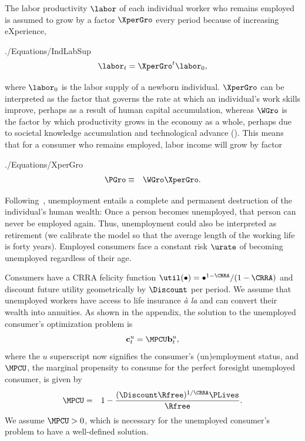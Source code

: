 \documentclass[titlepage]{\econtex}\newcommand{\texname}{cjSOE}
\begin{document}
The labor
productivity $\labor$ of each individual worker who remains employed
is assumed to grow by a factor $\XperGro$ every period because of increasing
eXperience,
\begin{verbatimwrite}{./Equations/IndLabSup}
\begin{equation}
\labor_{t} =    \XperGro^t \labor_{0}
\label{eq:IndLabSup},
\end{equation}
\end{verbatimwrite}

where $\labor_0$ is the labor supply of a newborn
individual. $\XperGro$ can be interpreted as the factor that governs
the rate at which an individual's work skills improve, perhaps as a
result of human capital accumulation, whereas $\WGro$ is the factor by
which productivity grows in the economy as a whole, perhaps due to
societal knowledge accumulation and technological advance
(\cite{mankiw:growth}). This means that for a consumer who remains
employed, labor income will grow by factor
\begin{verbatimwrite}{./Equations/XperGro}
\begin{eqnarray*}
\PGro & \equiv & \WGro \XperGro.
\end{eqnarray*}
\end{verbatimwrite}


Following~\cite{toche:urisk}, unemployment entails a complete and permanent destruction of the individual's human wealth: Once a person becomes unemployed, that person can never be employed
again. Thus, unemployment could also be interpreted as retirement (we calibrate the model so that the average length of the working life is forty years). Employed consumers face a constant risk $\urate$ of becoming unemployed regardless of their age.

Consumers have a CRRA felicity function $\util(\bullet)=
\bullet^{1-\CRRA}/(1-\CRRA)$ and discount future utility geometrically by $\Discount$ per period.
We assume that unemployed workers have access to life insurance {\it \`{a} la} \cite{blanchardFinite} and can convert their wealth into annuities.
As shown in the appendix, the solution to the unemployed consumer's optimization problem is
\begin{equation}
\cLevU_{t} = \MPCU \bLevU_t
\label{eq:cpfinfhorunemp} ,
\end{equation}
where the $u$ superscript now signifies the consumer's (un)employment status, and $\MPCU$, the marginal propensity to consume for the perfect foresight unemployed consumer, is given by
\begin{eqnarray}
\MPCU & = & 1- \frac{(\Discount \Rfree)^{1/\CRRA}\PLives}{\Rfree}.
\label{eq:kappaDef}
\end{eqnarray}
We assume $\MPCU > 0$, which is necessary for the unemployed consumer's problem to have a well-defined solution.
\end{document}
